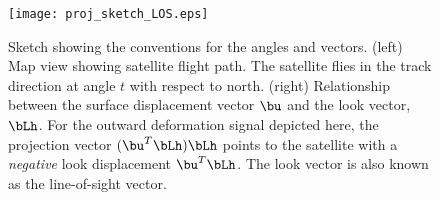  
\begin{figure}
\centering
\texttt{[image: proj\_sketch\_LOS.eps]}
\caption[]
{{
Sketch showing the conventions for the angles and vectors.
(left) Map view showing satellite flight path. The satellite flies in the track direction at angle $t$ with respect to north.
(right) Relationship between the surface displacement vector $\bu$ and the look vector, $\bLh$.
For the outward deformation signal depicted here, the projection vector $(\bu^T\bLh)\bLh$ points to the satellite with a {\em negative} look displacement $\bu^T\bLh$.
The look vector is also known as the line-of-sight vector.
\label{proj}
}}
\end{figure}

